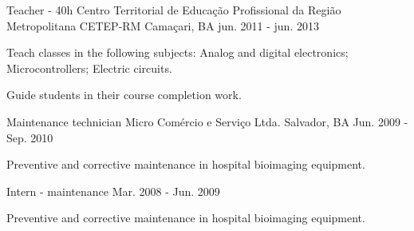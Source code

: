 \begin{cventries}
  \cventry
    {Teacher - 40h} %
    {Centro Territorial de Educação Profissional da Região Metropolitana CETEP-RM} %
    {Camaçari, BA} %
    {jun. 2011 - jun. 2013} %
    {
      \begin{cvitems} %
        \item {Teach classes in the following subjects: Analog and digital electronics; Microcontrollers; Electric circuits.}
        \item {Guide students in their course completion work.}
      \end{cvitems}
    }
    
    
  \cventry
    {Maintenance technician} %
    {Micro Comércio e Serviço Ltda.} %
    {Salvador, BA} %
    {Jun. 2009 - Sep. 2010} %
    {
      \begin{cvitems} %
        \item {Preventive and corrective maintenance in hospital bioimaging equipment.}
      \end{cvitems}
    }

  \cventry
    {Intern - maintenance} %
    {} %
    {} %
    {Mar. 2008 - Jun. 2009} %
    {
      \begin{cvitems} %
        \item {Preventive and corrective maintenance in hospital bioimaging equipment.}
      \end{cvitems}
    }


\end{cventries}

